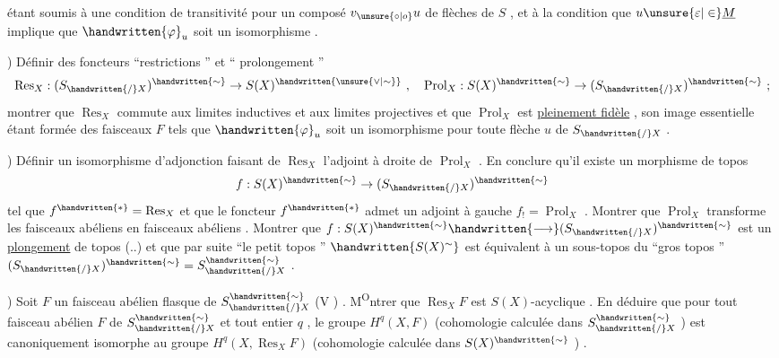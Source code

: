 étant soumis à une condition de transitivité pour un composé \(v_{\unsure{\circ|o}}u\) de flèches de \(S\) , et à la condition que \(u\unsure{\varepsilon|\in}\underline{M}\) implique que \(\handwritten{\varphi}_u\) soit un isomorphisme .

) Définir des foncteurs ``restrictions '' et `` prolongement ''
\[
\operatorname{Res}_X:(S_{\handwritten{/}X})^{\handwritten{\sim}}\to S(X)^{\handwritten{\unsure{\vee|\sim}}}\ ,\quad
\operatorname{Prol}_X:S(X)^{\handwritten{\sim}}\to(S_{\handwritten{/}X})^{\handwritten{\sim}}\ ;
\]
montrer que \(\operatorname{Res}_X\) commute aux limites inductives et aux limites projectives et que \(\operatorname{Prol}_X\) est \uline{pleinement fidèle} , son image essentielle étant formée des faisceaux \(F\) tels que \(\handwritten{\varphi}_u\) soit un isomorphisme pour toute flèche \(u\) de  \(S_{\handwritten{/}X}\) .

) Définir un isomorphisme d'adjonction faisant de \(\operatorname{Res}_X\) l'adjoint à droite de \(\operatorname{Prol}_X\) . En conclure qu'il existe un morphisme de topos
\[
f:S(X)^{\handwritten{\sim}}\to(S_{\handwritten{/}X})^{\handwritten{\sim}}
\]
tel que \(f^{\handwritten{*}}=\operatorname{Res}_X\) et que le foncteur \(f^{\handwritten{*}}\) admet un adjoint à gauche \(f_!=\operatorname{Prol}_X\) . Montrer que \(\operatorname{Prol}_X\) transforme les faisceaux abéliens en faisceaux abéliens . Montrer que \(f:S(X)^{\handwritten{\sim}}\handwritten{\longrightarrow}(S_{\handwritten{/}X})^{\handwritten{\sim}}\) est un \uline{plongement} de topos (..) et que par suite ``le petit topos '' \(\handwritten{S(X)^{\sim}}\) est  équivalent à un sous-topos du ``gros topos '' \((S_{\handwritten{/}X})^{\handwritten{\sim}}=S^{\handwritten{\sim}}_{\handwritten{/}X}\) .

) Soit \(F\) un faisceau abélien flasque de \(S^{\handwritten{\sim}}_{\handwritten{/}X}\) (V ) . M\textsuperscript{O}ntrer que \(\operatorname{Res}_X F\) est \(S(X)\)-acyclique . En déduire que pour tout faisceau abélien \(F\) de \(S^{\handwritten{\sim}}_{\handwritten{/}X}\) et tout entier \(q\) , le groupe \(H^q(X,F)\) (cohomologie calculée dans \(S^{\handwritten{\sim}}_{\handwritten{/}X}\) ) est canoniquement isomorphe au groupe \(H^q(X,\operatorname{Res}_X F)\) (cohomologie calculée dans \(S(X)^{\handwritten{\sim}}\) ) .

